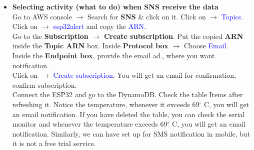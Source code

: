 \documentclass[12pt,a4paper]{article}
\begin{document}
\begin{justify}
\begin{itemize}
\noindent Select the fourth one: \textbf{Send a message as an SNS push notification} and then click on $ \rightarrow $ \textcolor{blue}{Configure action}.
A new page as given in fig.3 below will appear. 



\vspace{-5mm}
\begin{center} 
\texttt{[image: EXP\_26\_II\_Images/fig3.png]}
\end{center}
\vspace{-10mm}
\begin{center} {Figure 3.Configure action }\end{center}



SNS target $ \rightarrow $ \textcolor{blue}{Create}. Provide name as \textbf{esp32alert} \& click on \textcolor{blue}{Create}\\[4pt]
Message format: Select $ \rightarrow $ RAW\\[4pt]
Click on $ \rightarrow $ \textcolor{blue}{Create Role}.\\[4pt]
Provide the name of the role say \textbf{Role4AlertMsg} and click on $ \rightarrow $ \textcolor{blue}{Create role}.\\[3pt]
\textbf{Note: Role creation is related to AWS IAM (Identity Access Management) which is an entity with permissions to make AWS service requests.}\\[4pt]
The policy will be automatically attached. Click on $ \rightarrow $ \textcolor{blue}{Add action}. \\[3pt]
Finally, click on $ \rightarrow $ \textcolor{blue}{Create rule} at the end of the page. We can see the \textbf{NotificationRule}, that we have created.\\[4pt]
\item 	\textbf{Selecting activity (what to do) when SNS receive the data}\\[4pt]
Go to AWS console $ \rightarrow $ Search for \textbf{SNS} \& click on it. Click on $ \rightarrow $ \textcolor{blue}{Topics}. Click on $ \rightarrow $ \textcolor{blue}{esp32alert}  and copy the \textcolor{blue}{ARN}.\\[4pt]
Go to the \textbf{Subscription} $ \rightarrow $ \textbf{Create subscription}. Put the copied \textbf{ARN} inside the \textbf{Topic ARN} box. Inside \textbf{Protocol box}  $ \rightarrow $ Choose \textcolor{blue}{Email}.\\[4pt]
Inside the \textbf{Endpoint box}, provide the email ad., where you want notification. \\[4pt]
Click on $ \rightarrow $ \textcolor{blue}{Create subscription}. You will get an email for confirmation, confirm subscription.\\[3pt]
Connect the ESP32 and go to the DynamoDB. Check the table Items after refreshing it. Notice the temperature, whenever it exceeds 69$^{\circ}$ C, you will get an email notification. If you have deleted the table, you can check the serial monitor and whenever the temperature exceeds  69$^{\circ}$ C, you will get an email notification. Similarly, we can have set up for SMS notification in mobile, but it is not a free trial service.


\end{itemize}
\end{justify}
\end{document}
